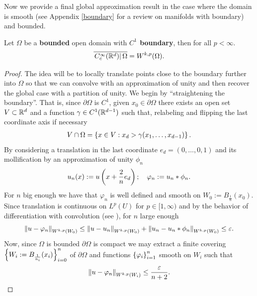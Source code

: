 \documentclass[
    a4paper,
    DIV=14,
    abstract=true,
    numbers=noenddot
]{scrartcl}
\begin{document}
Now we provide a final global approximation result in the case where the domain is smooth (see Appendix \ref{boundary} for a review on manifolds with boundary) and bounded.
\begin{theorem}\label{global} Let  $\Omega$ be a \textbf{bounded} open domain with  \textbf{$C^1$ boundary}, then for all $p<\infty$.
	\begin{align*}
		\overline{\left.C_c^\infty(\mathbb{R}^d)\right|{\Omega}}= W^{k,p}(\Omega).
	\end{align*}
\end{theorem}
\begin{proof}
	The idea will be to locally translate points close to the boundary further into $\Omega$ so that we can convolve with an approximation of unity and then recover the global case with a partition of unity. We begin by ``straightening the boundary''. That is, since $ \partial \Omega$ is $C^1$,  given $x_0 \in \partial  \Omega$ there exists an open set $V \subset \mathbb{R}^d$ and a function  $\gamma \in  C^1(\mathbb{R}^{d-1})$ such that, relabeling  and flipping the last coordinate axis if necessary
	\begin{align*}
		V \cap \Omega = \left\{x \in V :x_d  >\gamma (x_1,\ldots,x_{d-1})\right\}  .
	\end{align*}
	By considering a translation in the last coordinate $e_d=(0,\ldots,0,1)$ and its mollification by an approximation of unity $\phi_n$
	\begin{align*}
		u_n(x):= u\left(x+ \frac{2}{n}e_d \right); \quad \varphi_n:= u_n *\phi_n .
	\end{align*}
	For $n$ big enough we have that  $\varphi_n$ is well defined and smooth on $W_0:=B_{\frac{1}{n}}(x_0)$. Since translation is continuous on $L^p(U)$ for  $p \in [1,\infty)$ and by the behavior of differentiation with convolution  (see ), for $n$ large enough
	\begin{align*}
		\left\lVert u -\varphi_n \right\rVert_{W^{k,p}(W_0)}\leq \left\lVert u -u_n \right\rVert_{W^{k,p}(W_0)}+\left\lVert u_n -u_n*\phi_n \right\rVert_{W^{k,p}(W_0)}\leq \varepsilon.
	\end{align*}
	Now, since $\Omega$ is bounded $\partial \Omega$ is compact we may extract a finite covering $\left\{W_i:=B_{\frac{1}{n_i}}(x_i)\right\}_{i=0}^n $ of  $\partial \Omega$ and functions $\left\{\varphi_i\right\}_{i=1}^n$ smooth on $W_i$ such that
	\begin{align*}
		\left\lVert u -\varphi_n \right\rVert_{W^{k,p}(W_i)}\leq \frac{\varepsilon}{n+2}  .
	\end{align*}


\end{proof}
\end{document}
